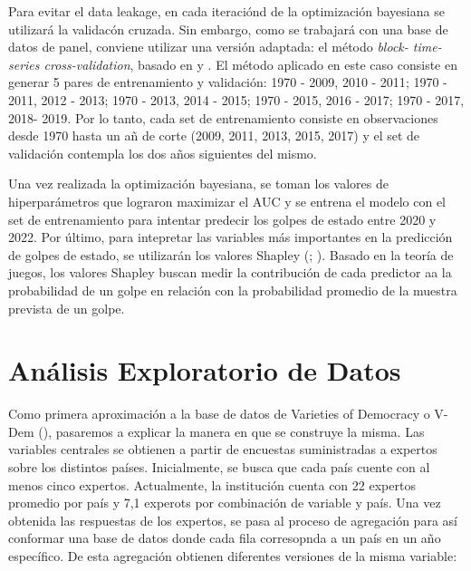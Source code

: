 \documentclass{article}
\begin{document}
Para evitar el data leakage, en cada iteraciónd de la optimización bayesiana
se utilizará la validacón cruzada. Sin embargo, como se trabajará con una base
de datos de panel, conviene utilizar una versión adaptada: el método \textit{block-
time-series cross-validation}, basado en \cite{Bur94} y \cite{RAc00}. El método 
aplicado en este caso consiste en generar 5 pares de entrenamiento y validación: 
{1970 - 2009, 2010 - 2011}; {1970 - 2011, 2012 - 2013}; {1970 - 2013, 2014 - 2015}; 
{1970 - 2015, 2016 - 2017}; {1970 - 2017, 2018- 2019}. Por lo tanto, cada set de 
entrenamiento consiste en observaciones desde 1970 hasta un añ de corte (2009, 
2011, 2013, 2015, 2017) y el set de validación contempla los dos años siguientes 
del mismo.

Una vez realizada la optimización bayesiana, se toman los valores de hiperparámetros
que lograron maximizar el AUC y se entrena el modelo con el set de entrenamiento para
intentar predecir los golpes de estado entre 2020 y 2022. Por último, para intepretar
las variables más importantes en la predicción de golpes de estado, se utilizarán los
valores Shapley (\cite{Str10}; \cite{Lun17}). Basado en la teoría de juegos, los
valores Shapley buscan medir la contribución de cada predictor aa la probabilidad de
un golpe en relación con la probabilidad promedio de la muestra prevista de un golpe.

\section{Análisis Exploratorio de Datos}

Como primera aproximación a la base de datos de Varieties of Democracy o V-Dem 
(\cite{CopMet24}), pasaremos a explicar la manera en que se construye la misma. Las
variables centrales se obtienen a partir de encuestas suministradas a expertos
sobre los distintos países. Inicialmente, se busca que cada país cuente con al menos
cinco expertos. Actualmente, la institución cuenta con 22 expertos promedio por país
y 7,1 experots por combinación de variable y país. Una vez obtenida las respuestas
de los expertos, se pasa al proceso de agregación para así conformar una base de datos
donde cada fila corresopnda a un país en un año específico. De esta agregación
obtienen diferentes versiones de la misma variable:
\end{document}
